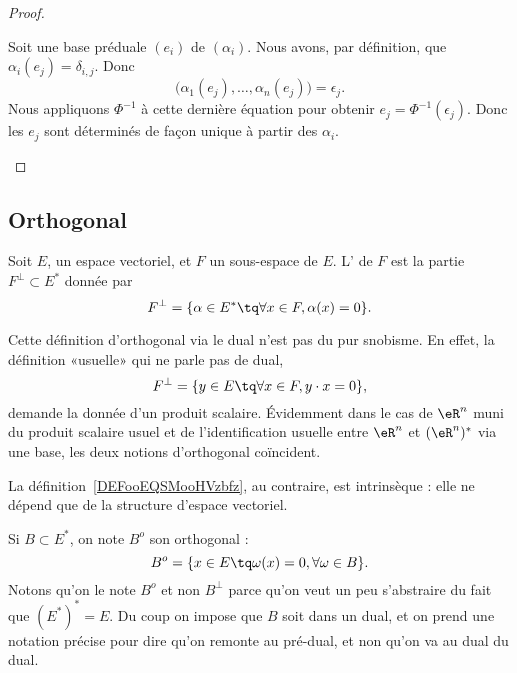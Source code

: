 \begin{proof}
\begin{subproof}
		\spitem[Unicité]
		Soit une base préduale \( (e_i)\) de \( (\alpha_i)\). Nous avons, par définition, que \( \alpha_i(e_j)=\delta_{i,j}\). Donc
		\begin{equation}
			\big( \alpha_1(e_j),\ldots, \alpha_n(e_j) \big)=\epsilon_j.
		\end{equation}
		Nous appliquons \( \Phi^{-1}\) à cette dernière équation pour obtenir \( e_j=\Phi^{-1}(\epsilon_j)\). Donc les \( e_j\) sont déterminés de façon unique à partir des \( \alpha_i\).
	\end{subproof}
\end{proof}



\subsection{Orthogonal}

\begin{definition}      \label{DEFooEQSMooHVzbfz}
	Soit \( E\), un espace vectoriel, et \( F\) un sous-espace de \( E\). L' de \( F\) est la partie \( F^{\perp}\subset E^*\) donnée par
	\begin{equation}    \label{Eqiiyple}
		F^{\perp}=\{ \alpha\in E^*\tq \forall x\in F,\alpha(x)=0 \}.
	\end{equation}
\end{definition}

Cette définition d'orthogonal via le dual n'est pas du pur snobisme. En effet, la définition «usuelle» qui ne parle pas de dual,
\begin{equation}
	F^{\perp}=\{ y\in E\tq \forall x\in F,y\cdot x=0 \},
\end{equation}
demande la donnée d'un produit scalaire. Évidemment dans le cas de \( \eR^n\) muni du produit scalaire usuel et de l'identification usuelle entre \( \eR^n\) et \( (\eR^n)^*\) via une base, les deux notions d'orthogonal coïncident.

La définition~\ref{DEFooEQSMooHVzbfz}, au contraire, est intrinsèque : elle ne dépend que de la structure d'espace vectoriel.

Si \( B\subset E^*\), on note \( B^o\) son orthogonal :
\begin{equation}
	B^o=\{ x\in E\tq \omega(x)=0, \forall\omega\in B \}.
\end{equation}
Notons qu'on le note \( B^o\) et non \( B^{\perp}\) parce qu'on veut un peu s'abstraire du fait que \( (E^*)^*=E\). Du coup on impose que \( B\) soit dans un dual, et on prend une notation précise pour dire qu'on remonte au pré-dual, et non qu'on va au dual du dual.

